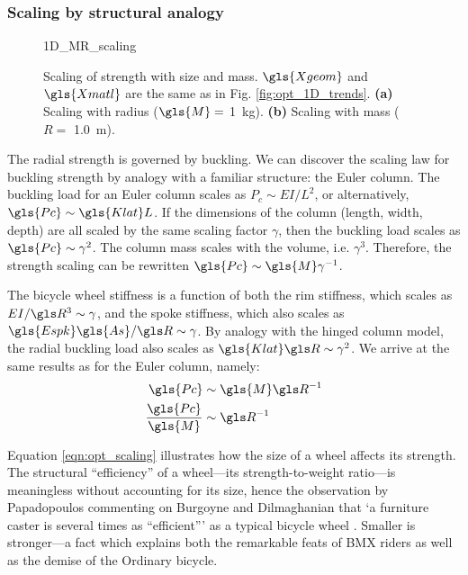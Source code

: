 \documentclass[\rootdir/thesis.tex]{subfiles}
\begin{document}
\subsubsection*{Scaling by structural analogy}

\begin{figure}
\centering
{1D_MR_scaling}
\caption{Scaling of strength with size and mass. $\gls{Xgeom}$ and $\gls{Xmatl}$ are the same as in Fig. \ref{fig:opt_1D_trends}. \textbf{(a)} Scaling with radius ($\gls{M}=$ \SI{1}{kg}). \textbf{(b)} Scaling with mass ($R=$ \SI{1.0}{m}).}
\label{fig:opt_1D_scaling}
\end{figure}

The radial strength is governed by buckling. We can discover the scaling law for buckling strength by analogy with a familiar structure: the Euler column. The buckling load for an Euler column scales as $P_c \sim EI/L^2$, or alternatively, $\gls{Pc} \sim \gls{Klat} L$. If the dimensions of the column (length, width, depth) are all scaled by the same scaling factor $\gamma$, then the buckling load scales as $\gls{Pc} \sim \gamma^2$. The column mass scales with the volume, i.e. $\gamma^3$. Therefore, the strength scaling can be rewritten $\gls{Pc} \sim \gls{M} \gamma^{-1}$.

The bicycle wheel stiffness is a function of both the rim stiffness, which scales as $EI/\R^3 \sim \gamma$, and the spoke stiffness, which also scales as $\gls{Espk}\gls{As}/\R \sim \gamma$. By analogy with the hinged column model, the radial buckling load also scales as $\gls{Klat}\R \sim \gamma^2$. We arrive at the same results as for the Euler column, namely:
\begin{subequations}
\label{eqn:opt_scaling}
\begin{align}
\gls{Pc}                 & \sim \gls{M} \R^{-1}\\
\frac{\gls{Pc}}{\gls{M}} & \sim \R^{-1}
\end{align}
\end{subequations}

Equation \eqref{eqn:opt_scaling} illustrates how the size of a wheel affects its strength. The structural ``efficiency'' of a wheel---its strength-to-weight ratio---is meaningless without accounting for its size, hence the observation by Papadopoulos commenting on Burgoyne and Dilmaghanian \cite{Burgoyne1993} that `a furniture caster is several times as ``efficient''' as a typical bicycle wheel \cite{Papadopoulos1995}. Smaller is stronger---a fact which explains both the remarkable feats of BMX riders as well as the demise of the Ordinary bicycle.
\end{document}
